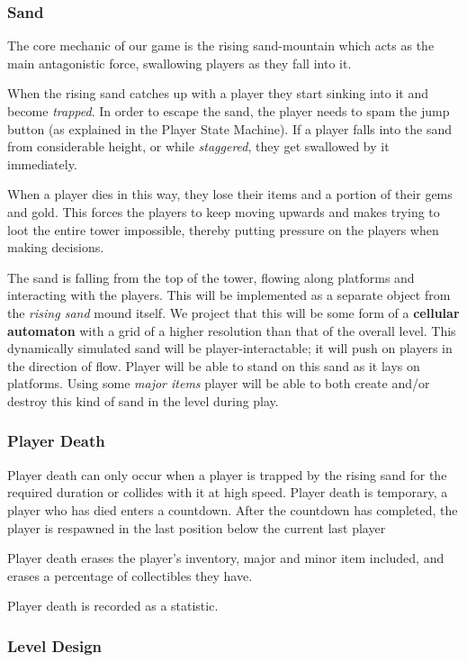 \subsubsection{Sand}

The core mechanic of our game is the rising sand-mountain which acts as the main antagonistic force, swallowing players as they fall into it. 

When the rising sand catches up with a player they start sinking into it and become \emph{trapped}. In order to escape the sand, the player needs to spam the jump button (as explained in the Player State Machine). If a player falls into the sand from considerable height, or while \emph{staggered}, they get swallowed by it immediately. 

When a player dies in this way, they lose their items and a portion of their gems and gold. This forces the players to keep moving upwards and makes trying to loot the entire tower impossible, thereby putting pressure on the players when making decisions.

The sand is falling from the top of the tower, flowing along platforms and interacting with the players. This will be implemented as a separate object from the \emph{rising sand} mound itself. We project that this will be some form of a \textbf{cellular automaton} with a grid of a higher resolution than that of the overall level. This dynamically simulated sand will be player-interactable; it will push on players in the direction of flow. Player will be able to stand on this sand as it lays on platforms. Using some \emph{major items} player will be able to both create and/or destroy this kind of sand in the level during play.

\subsubsection{Player Death}
Player death can only occur when a player is trapped by the rising sand for the required duration or collides with it at high speed. Player death is temporary, a player who has died enters a countdown. After the countdown has completed, the player is respawned in the last position below the current last player

Player death erases the player's inventory, major and minor item included, and erases a percentage of collectibles they have.

Player death is recorded as a statistic.


\subsubsection{Level Design}

